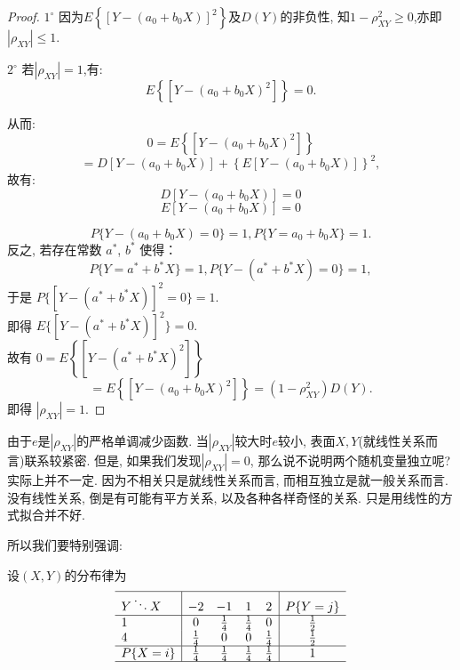 \begin{proof}
    \qquad $1^{\circ}$ 因为$E\left\{\left[Y-\left(a_0 + b_0X\right)\right]^2\right\}$及$D\left(Y\right)$的非负性, 
     知$1-\rho_{X Y}^2 \geq 0$,亦即$\left| \rho_{X Y} \right| \leq 1.$

     
    \qquad $2^{\circ}$ 若$\left|\rho_{X Y}\right| = 1$,有:
    $$
       E\left\{\left[Y - (a_0 + b_0X)^2\right]\right\} = 0.
    $$
    
    从而:
    $$
        0 =E\left\{\left[Y - (a_0 + b_0X)^2\right]\right\} 
    $$
    $$
        = D\left[Y - (a_0+b_0X)\right] + \left\{E\left[Y - \left(a_0+b_0X\right)\right]\right\}^2,
   $$
    故有:
    $$
     D\left[Y - (a_0+b_0X)\right] = 0
    $$
    $$
    E\left[Y - \left(a_0+b_0X\right)\right] = 0
    $$

    \[P\{Y - (a_0 + b_0X) = 0\} = 1, P\{Y = a_0 + b_0X\} = 1.\]
        反之, 若存在常数 $a^*$, $b^*$ 使得：
        \[P\{Y = a^* + b^*X\} = 1, P\{Y - (a^* + b^*X) = 0\} = 1,\]
        于是 \qquad $P\{[Y - (a^* + b^*X)]^2 = 0\} = 1.$\\
        即得 \qquad $E\{[Y - (a^* + b^*X)]^2\} = 0.$\\
        故有 \qquad $0 =E\left\{\left[Y - (a^* + b^*X)^2\right]\right\}$
        \[
             =E\left\{\left[Y - (a_0 + b_0X)^2\right]\right\} =\left(1-\rho_{X Y}^2\right) D(Y)  .
        \]
        即得 \qquad $\left|\rho_{X Y}\right| = 1.$
\end{proof}

由于$e$是$\left|\rho_{X Y}\right|$的严格单调减少函数. 当$\left|\rho_{X Y}\right|$较大时$e$较小, 表面$X,Y$(就线性关系而言)联系较紧密. 但是, 如果我们发现$|\rho_{XY}|=0$, 那么说不说明两个随机变量独立呢? 实际上并不一定. 因为不相关只是就线性关系而言, 而相互独立是就一般关系而言. 没有线性关系, 倒是有可能有平方关系, 以及各种各样奇怪的关系. 只是用线性的方式拟合并不好. 

所以我们要特别强调: 

\begin{center}
\end{center}

\begin{example}
    设$(X,Y)$的分布律为
         $$
                \begin{array}{l|cccc|c}
                    \hline Y \ddots X         & -2            & -1            & 1            & 2            & P\{Y=j\}     \\
                    \hline 1        &0  & \frac{1}{4}            & \frac{1}{4}            & 0            & \frac{1}{2} \\
                    4               & \frac{1}{4}            & 0 & 0 & \frac{1}{4} & \frac{1}{2} \\
                    \hline P\{X=i\} & \frac{1}{4} & \frac{1}{4} & \frac{1}{4} & \frac{1}{4} & 1            \\
                    \hline
                \end{array}
            $$
\end{example}


